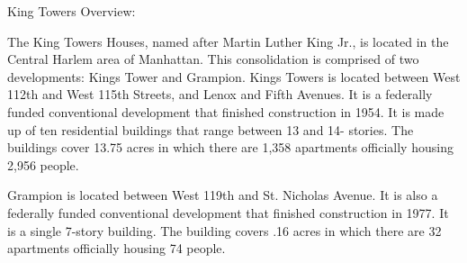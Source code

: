 King Towers Overview: 

The King Towers Houses, named after Martin Luther King Jr., is located in the Central Harlem area of Manhattan. This consolidation is comprised of two developments: Kings Tower and Grampion. Kings Towers is located between West 112th and West 115th Streets, and Lenox and Fifth Avenues. It is a federally funded conventional development that finished construction in 1954. It is made up of ten residential buildings that range between 13 and 14- stories. The buildings cover 13.75 acres in which there are 1,358 apartments officially housing 2,956 people.  

 

Grampion is located between West 119th and St. Nicholas Avenue. It is also a federally funded conventional development that finished construction in 1977. It is a single 7-story building. The building covers .16 acres in which there are 32 apartments officially housing 74 people.  
